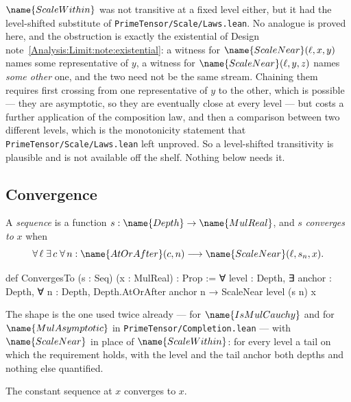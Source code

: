 \begin{remark}
\label{Analysis:Limit:rem:not-transitive}
$\name{ScaleWithin}$ was not transitive at a fixed level either, but it had the
level-shifted substitute of \texttt{PrimeTensor/Scale/Laws.lean}.  No analogue
is proved here, and the obstruction is exactly the existential of
Design note~\ref{Analysis:Limit:note:existential}: a witness for
$\name{ScaleNear}(\ell,x,y)$ names some representative of $y$, a witness for
$\name{ScaleNear}(\ell,y,z)$ names \emph{some other} one, and the two need not
be the same stream.  Chaining them requires first crossing from one
representative of $y$ to the other, which is possible --- they are asymptotic,
so they are eventually close at every level --- but costs a further application
of the composition law, and then a comparison between two different levels,
which is the monotonicity statement that
\texttt{PrimeTensor/Scale/Laws.lean} left unproved.  So a level-shifted
transitivity is plausible and is not available off the shelf.  Nothing below
needs it.
\end{remark}

\subsection{Convergence}

\begin{definition}
\label{Analysis:Limit:def:converges}
A \emph{sequence} is a function $s : \name{Depth} \to \name{MulReal}$, and
$s$ \emph{converges to} $x$ when
\[
  \forall\, \ell\; \exists\, c\; \forall\, n :
    \name{AtOrAfter}(c,n) \longrightarrow \name{ScaleNear}(\ell, s_n, x).
\]
\end{definition}

\begin{leancode}
def ConvergesTo (s : Seq) (x : MulReal) : Prop :=
  ∀ level : Depth,
    ∃ anchor : Depth,
      ∀ n : Depth,
        Depth.AtOrAfter anchor n →
        ScaleNear level (s n) x
\end{leancode}

The shape is the one used twice already --- for $\name{IsMulCauchy}$ and for
$\name{MulAsymptotic}$ in \texttt{PrimeTensor/Completion.lean} --- with
$\name{ScaleNear}$ in place of $\name{ScaleWithin}$: for every level a tail on
which the requirement holds, with the level and the tail anchor both depths and
nothing else quantified.

\begin{lemma}\label{Analysis:Limit:lem:constant}
The constant sequence at $x$ converges to $x$.
\end{lemma}

